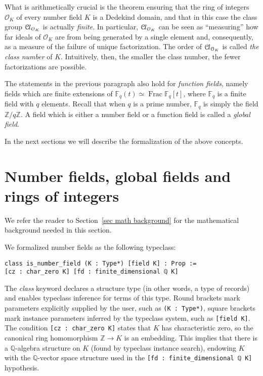 \documentclass[a4paper,USenglish,cleveref, autoref, thm-restate]{lipics-v2021}
\newcommand{\lean}[1]{\texttt{#1}\xspace} %
\newcommand*{\OK}[1][K]{\mathcal{O}_{#1}}
\newcommand*{\Cl}{\mathcal{C}\kern-.075em l}
\newcommand*{\Fq}[1][q]{\mathbb{F}_{#1}}
\newcommand{\Q}{\mathbb{Q}}
\newcommand{\Z}{\mathbb{Z}}
\DeclareMathOperator{\Frac}{Frac}
\begin{document}
What is arithmetically crucial is the theorem ensuring that the ring of integers $\OK$ of every number field $K$ is a Dedekind domain,
and that in this case the class group $\Cl_{\OK}$ is actually \emph{finite}.
In particular, $\Cl_{\OK}$ can be seen as ``measuring'' how far ideals of $\OK$ are from being generated by a single element and,
consequently, as a measure of the failure of unique factorization.
The order of $\Cl_{\OK}$ is called \emph{the class number} of $K$.
Intuitively, then, the smaller the class number, the fewer factorizations are possible.

The statements in the previous paragraph also hold for \emph{function fields}, namely fields which are finite extensions of $\Fq(t) \simeq \Frac \Fq[q][t]$, where $\Fq$ is a finite field with $q$ elements. Recall that when $q$ is a prime number, $\Fq$ is simply the field $\Z/q\Z$.
A field which is either a number field or a function field is called a \emph{global field}.

In the next sections we will describe the formalization of the above concepts.

\section{Number fields, global fields and rings of integers}

We refer the reader to Section~\ref{sec math background} for the mathematical background needed in this section.

We formalized number fields as the following typeclass:
\begin{lstlisting}
class is_number_field (K : Type*) [field K] : Prop :=
[cz : char_zero K] [fd : finite_dimensional ℚ K]
\end{lstlisting}
The \emph{class} keyword declares a structure type (in other words, a type of records) and enables typeclass inference for terms of this type.
Round brackets mark parameters explicitly supplied by the user, such as \lean{(K : Type*)},
square brackets mark instance parameters inferred by the typeclass system, such as \lean{[field K]}. The condition \lean{[cz : char\_zero K]} states that $K$ has characteristic zero, so the canonical ring homomorphism $\Z \to K$ is an embedding.
This implies that there is a $\Q$-algebra structure on $K$ (found by typeclass instance search), endowing $K$ with the $\Q$-vector space structure used in the \mbox{\lean{[fd : finite\_dimensional ℚ K]}} hypothesis.
\end{document}
